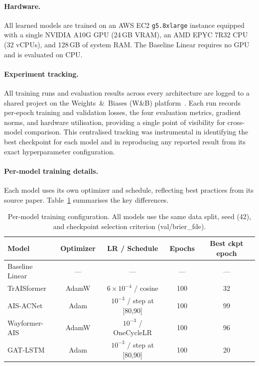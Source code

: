 \documentclass[12pt, a4paper]{article}
\begin{document}
\paragraph{Hardware.}
All learned models are trained on an AWS EC2 \texttt{g5.8xlarge}
instance equipped with a single NVIDIA A10G GPU (24\,GB VRAM),
an AMD EPYC 7R32 CPU (32 vCPUs), and 128\,GB of system RAM.
The Baseline Linear requires no GPU and is evaluated on CPU.

\paragraph{Experiment tracking.}
All training runs and evaluation results across every architecture are logged to a shared project on the Weights~\&~Biases (W\&B)
platform~\citep{wandb2020}.  Each run records per-epoch training and validation
losses, the four evaluation metrics, gradient norms, and hardware utilisation,
providing a single point of visibility for cross-model comparison.  This
centralised tracking was instrumental in identifying the best checkpoint for each
model and in reproducing any reported result from its exact hyperparameter
configuration.

\paragraph{Per-model training details.}
Each model uses its own optimizer and schedule, reflecting best practices
from its source paper.  Table~\ref{tab:training_summary} summarises the
key differences.

\begin{table}[H]
  \centering
  \caption{Per-model training configuration. All models use the same
  data split, seed (42), and checkpoint selection criterion (val/brier\_fde).}
  \label{tab:training_summary}
  \begin{tabular}{lcccc}
    \toprule
    \textbf{Model} & \textbf{Optimizer} & \textbf{LR / Schedule}
                   & \textbf{Epochs} & \textbf{Best ckpt epoch} \\
    \midrule
    Baseline Linear & --- & --- & --- & --- \\
    TrAISformer     & AdamW & $6\!\times\!10^{-4}$ / cosine & 100 & 32 \\
    AIS-ACNet       & Adam  & $10^{-3}$ / step at [80,90]   & 100 & 99 \\
    Wayformer-AIS   & AdamW & $10^{-3}$ / OneCycleLR        & 100 & 96 \\
    GAT-LSTM        & Adam  & $10^{-3}$ / step at [80,90]   & 100 & 20 \\
    \bottomrule
  \end{tabular}
\end{table}
\end{document}
